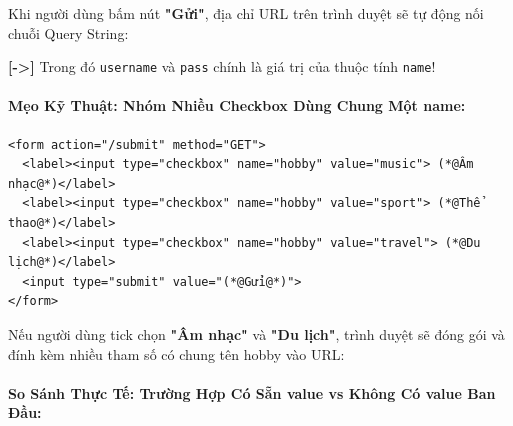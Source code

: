 \documentclass[11pt,oneside]{book}
\newcommand{\codeinline}[1]{\textcolor{accentOrange}{\texttt{#1}}}
\begin{document}
\begin{browserWindow}
\sffamily\small
Khi người dùng bấm nút \textbf{"Gửi"}, địa chỉ URL trên trình duyệt sẽ tự động nối chuỗi Query String:
\begin{center}
\end{center}
\textcolor{primaryBlue}{\textbf{[->]}} Trong đó \codeinline{username} và \codeinline{pass} chính là giá trị của thuộc tính \codeinline{name}!
\end{browserWindow}

\paragraph{Mẹo Kỹ Thuật: Nhóm Nhiều Checkbox Dùng Chung Một name:}

\begin{codeWindow}
\begin{lstlisting}[language=HTML5]
<form action="/submit" method="GET">
  <label><input type="checkbox" name="hobby" value="music"> (*@Âm nhạc@*)</label>
  <label><input type="checkbox" name="hobby" value="sport"> (*@Thể thao@*)</label>
  <label><input type="checkbox" name="hobby" value="travel"> (*@Du lịch@*)</label>
  <input type="submit" value="(*@Gửi@*)">
</form>
\end{lstlisting}
\end{codeWindow}

\begin{noteBox}
Nếu người dùng tick chọn \textbf{"Âm nhạc"} và \textbf{"Du lịch"}, trình duyệt sẽ đóng gói và đính kèm nhiều tham số có chung tên hobby vào URL:
\begin{center}
\end{center}
\end{noteBox}

\paragraph{So Sánh Thực Tế: Trường Hợp Có Sẵn value vs Không Có value Ban Đầu:}
\end{document}

